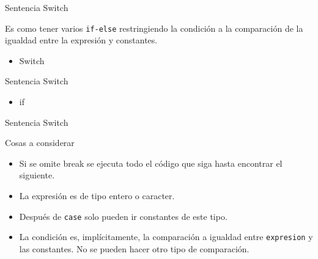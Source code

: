 \begin{frame}[fragile]{Sentencia Switch}

Es como tener varios \texttt{if-else} restringiendo la condición a la
comparación de la igualdad entre la expresión y constantes.

\begin{itemize}
\item
  Switch

\begin{Shaded}
\begin{Highlighting}[]
 
    \NormalTok{\{}
     
        \NormalTok{;}
     
        \NormalTok{;}
    \NormalTok{\}}
\end{Highlighting}
\end{Shaded}
\end{itemize}

\end{frame}

\begin{frame}[fragile]{Sentencia Switch}

\begin{itemize}
\item
  if

\begin{Shaded}
\begin{Highlighting}[]
 
    \NormalTok{\{}
    \NormalTok{\}}
     
        \NormalTok{\{}
        \NormalTok{\}}
\end{Highlighting}
\end{Shaded}
\end{itemize}

\end{frame}

\begin{frame}{Sentencia Switch}

Cosas a considerar

\begin{itemize}
\item
  Si se omite break se ejecuta todo el código que siga hasta encontrar
  el siguiente.
\item
  La expresión es de tipo entero o caracter.
\item
  Después de \texttt{case} solo pueden ir constantes de este tipo.
\item
  La condición es, implícitamente, la comparación a igualdad entre
  \texttt{expresion} y las constantes. No se pueden hacer otro tipo de
  comparación.
\end{itemize}

\end{frame}

